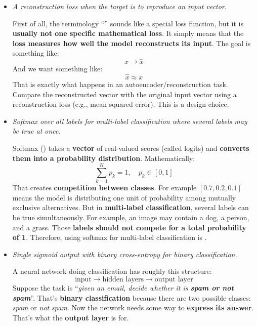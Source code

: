 \begin{itemize}
    \item \emph{A reconstruction loss when the target is to reproduce an input vector.}\label{def:reconstruction-loss}

        First of all, the terminology ``\emph{}'' sounds like a special loss function, but it is \textbf{usually not one specific mathematical loss}. It simply means that the \textbf{loss measures how well the model reconstructs its input}. The goal is something like:
        \begin{equation*}
            x \to \hat{x}
        \end{equation*}
        And we want something like:
        \begin{equation*}
            \hat{x} \approx x
        \end{equation*}
        That is exactly what happens in an autoencoder/reconstruction task. Compare the reconstructed vector with the original input vector using a reconstruction loss (e.g., mean squared error). This is a  design choice.

    \item \emph{Softmax over all labels for multi-label classification where several labels may be true at once.}

        Softmax () takes a \textbf{vector} of real-valued scores (called logits) and \textbf{converts them into a probability distribution}. Mathematically:
        \begin{equation*}
            \sum_{k=1}^{K} p_k = 1, \quad p_k \in [0, 1]
        \end{equation*}
        That creates \textbf{competition between classes}. For example $\left[0.7, 0.2, 0.1\right]$ means the model is distributing one unit of probability among mutually exclusive alternatives. But in \textbf{multi-label classification}, several labels can be true simultaneously. For example, an image may contain a dog, a person, and a grass. Those \textbf{labels should not compete for a total probability of 1}. Therefore, using softmax for multi-label classification is .

    \item \emph{Single sigmoid output with binary cross-entropy for binary classification.}

        A neural network doing classification has roughly this structure:
        \begin{equation*}
            \text{input} \to \text{hidden layers} \to \text{output layer}
        \end{equation*}
        Suppose the task is ``\emph{given an email, decide whether it is \textbf{spam or not spam}}''. That's \textbf{binary classification} because there are two possible classes: \emph{spam} or \emph{not spam}. Now the network needs some way to \textbf{express its answer}. That's what the \textbf{output layer} is for.


\end{itemize}
